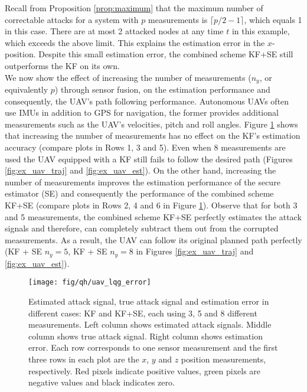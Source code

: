 \documentclass[twocolumn]{autart}    %
\newcommand{\rev}[1]{{\normalsize{{{\color{blue}#1}}}}}
\begin{document}
Recall from Proposition \ref{prop:maximum} that the maximum number of correctable \rev{attacks} for a system with $p$ measurements is $\lceil p/2-1 \rceil$, which equals 1 in this case. There are at most 2 attacked nodes at any time $t$ in this example, which exceeds the above limit. This explains the estimation error in the $x$-position. Despite this small estimation error, the combined scheme KF+SE still outperforms the KF on its own.
\\
We now show the effect of increasing the number of measurements ($n_y$, or equivalently $p$) through sensor fusion, on the estimation performance and consequently, the UAV's path following performance. Autonomous UAVs often use IMUs in addition to GPS for navigation, the former provides additional measurements such as the UAV's velocities, pitch and roll angles. Figure \ref{fig:ex_uav_error} shows that increasing the number of measurements has no effect on the KF's estimation accuracy (compare plots in Rows 1, 3 and 5). 
Even when 8 measurements are used the UAV equipped with a KF still fails to follow the desired path (Figures \ref{fig:ex_uav_traj} and \ref{fig:ex_uav_est}). On the other hand, increasing the number of measurements improves the estimation performance of the secure \rev{estimator} (SE) and consequently the performance of the combined scheme KF+SE (compare plots in Rows 2, 4 and 6 in Figure  \ref{fig:ex_uav_error}). Observe that for both 3 and 5 measurements, the combined scheme KF+SE perfectly estimates the attack signals and therefore, can completely subtract them out from the corrupted measurements. As a result, the UAV can follow its original planned path perfectly (KF + SE $n_y=5$, KF + SE $n_y=8$ in Figures \ref{fig:ex_uav_traj} and \ref{fig:ex_uav_est}).
\begin{figure}
\center
\texttt{[image: fig/qh/uav\_lqg\_error]}
\caption{Estimated attack signal, true attack signal and estimation error in different cases: KF and KF+SE, each using 3, 5 and 8 different measurements. Left column shows estimated attack signals. Middle column shows true attack signal. Right column shows estimation error. Each row corresponds to one sensor measurement and the first three rows in each plot are the $x$, $y$ and $z$ position measurements, respectively. Red pixels indicate positive values, green pixels are negative values and black indicates zero.}
\label{fig:ex_uav_error}
\end{figure}
\end{document}
